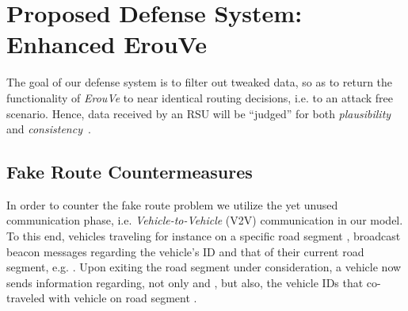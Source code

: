 \documentclass[conference]{IEEEtran}
\begin{document}
\begin{comment}
With the above consideration, we state a set of rules for a successful attack:\\
\textcolor{red}{is it simply repeated?}

\begin{enumerate}
\item First, accumulated data should be altered to an extent that would not easily alert the corresponding RSU, also mentioned in~\cite{} (although in a different use-case)
\item Second, vehicles should be sent in groups so as to have a serious impact in the order of  weighted roads as accumulated by {\it ErouVe} and thus affect 
the routing decisions
\item Third, attackers should be sent in a well scheduled basis, so as to continuously have fault information in the system\\
\end{enumerate}
\end{comment}




\section{Proposed Defense System: Enhanced ErouVe}
\label{prop-defense}

The goal of our defense system is to filter out tweaked data, so as to return the functionality of {\it ErouVe} to near identical routing decisions, i.e. to an attack
free scenario. Hence, data received by an RSU will be ``judged'' for both {\it plausibility} and {\it consistency}~\cite{khan2015detailed}. 

\subsection{Fake Route Countermeasures}

In order to counter the fake route problem we utilize the yet unused communication phase, i.e.  {\it Vehicle-to-Vehicle} (V2V) communication in our model.
 To this end, vehicles traveling for instance on a specific road segment , broadcast beacon messages regarding the vehicle's ID and that of their 
current road segment, e.g.  . Upon exiting the road segment under consideration, a vehicle  
now sends information regarding, not only  and , but also, the vehicle IDs that co-traveled with vehicle  on road segment . 
\end{document}

